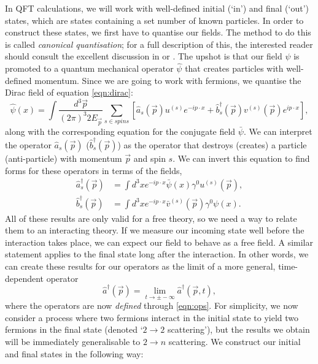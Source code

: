 In QFT calculations, we will work with well-defined initial (`in') and final (`out') states, which are states containing a set number of known particles. In order to construct these states, we first have to quantise our fields. The method to do this is called \emph{canonical quantisation}; for a full description of this, the interested reader should consult the excellent discussion in \cite{Peskin1995} or \cite{Srednicki2007}. The upshot is that our field $\psi$ is promoted to a quantum mechanical operator $\hat{\psi}$ that creates particles with well-defined momentum. Since we are going to work with fermions, we quantise the Dirac field of equation \ref{eqn:dirac}:
\begin{equation}
\hat{\psi}(x) = \int \frac{d^3 \vec{p}}{(2 \pi)^3 2 E_{\vec{p}}} \sum_{s \in spins} \left[\hat{a}_s(\vec{p}) u^{(s)} e^{-ip\cdot x} + \hat{b}_s^\dagger(\vec{p}) v^{(s)}(\vec{p})e^{i p \cdot x} \right],
\end{equation}
along with the corresponding equation for the conjugate field $\bar{\psi}$. We can interpret the operator $\hat{a}_s(\vec{p})$ ($\hat{b}^\dagger_s (\vec{p})$) as the operator that destroys (creates) a particle (anti-particle) with momentum $\vec{p}$ and spin $s$. We can invert this equation to find forms for these operators in terms of the fields,
\begin{subequations}
\label{eqn:ops}
\begin{align}
\hat{a}_s^\dagger (\vec{p}) & = \int d^3 x e^{-i p \cdot x} \bar{\psi}(x) \gamma^0 u^{(s)}(\vec{p}), \\
\hat{b}_s^\dagger (\vec{p}) & = \int d^3 x e^{- i p \cdot x} \bar{v}^{(s)}(\vec{p}) \gamma^0 \psi(x).
\end{align}
\end{subequations}
All of these results are only valid for a free theory, so we need a way to relate them to an interacting theory. If we measure our incoming state well before the interaction takes place, we can expect our field to behave as a free field. A similar statement applies to the final state long after the interaction. In other words, we can create these results for our operators as the limit of a more general, time-dependent operator
\begin{equation}
\hat{a}^\dagger(\vec{p}) = \lim_{t \to \pm -\infty} \hat{a}^\dagger(\vec{p}, t),
\end{equation}
where the operators are now \emph{defined} through \ref{eqn:ops}. For simplicity, we now consider a process where two fermions interact in the initial state to yield two fermions in the final state (denoted `$2\to2$ scattering'), but the results we obtain will be immediately generalisable to $2 \to n$ scattering. We construct our initial and final states in the following way:
